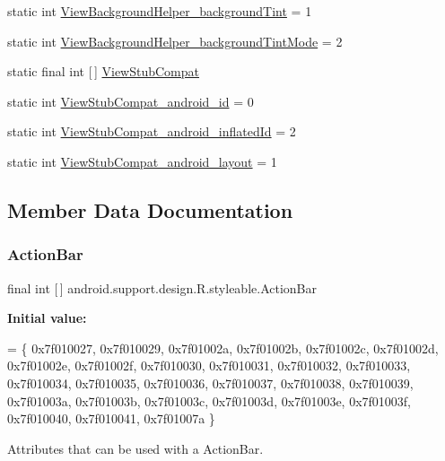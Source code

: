 \begin{DoxyCompactItemize}
\item 
static int \hyperlink{classandroid_1_1support_1_1design_1_1R_1_1styleable_a2e9994ef36fe7a2256990b68a1a32e6b}{View\+Background\+Helper\+\_\+background\+Tint} = 1
\item 
static int \hyperlink{classandroid_1_1support_1_1design_1_1R_1_1styleable_ad51f84023757d5598448db4232fbad8c}{View\+Background\+Helper\+\_\+background\+Tint\+Mode} = 2
\item 
static final int \mbox{[}$\,$\mbox{]} \hyperlink{classandroid_1_1support_1_1design_1_1R_1_1styleable_a9d1ab53e5b97dd9ed9bd6109532344ef}{View\+Stub\+Compat}
\item 
static int \hyperlink{classandroid_1_1support_1_1design_1_1R_1_1styleable_a38b4942d1655f9b64093db09ad074cbe}{View\+Stub\+Compat\+\_\+android\+\_\+id} = 0
\item 
static int \hyperlink{classandroid_1_1support_1_1design_1_1R_1_1styleable_ab000b31614eac45930f7c4b0a8e49919}{View\+Stub\+Compat\+\_\+android\+\_\+inflated\+Id} = 2
\item 
static int \hyperlink{classandroid_1_1support_1_1design_1_1R_1_1styleable_a779184c37f20616420968d01a403c746}{View\+Stub\+Compat\+\_\+android\+\_\+layout} = 1
\end{DoxyCompactItemize}


\subsection{Member Data Documentation}
\mbox{\label{classandroid_1_1support_1_1design_1_1R_1_1styleable_ab795220a96557d11f8c21359b95bed82}} 
\subsubsection{\texorpdfstring{Action\+Bar}{ActionBar}}
{\footnotesize\ttfamily final int \mbox{[}$\,$\mbox{]} android.\+support.\+design.\+R.\+styleable.\+Action\+Bar\hspace{0.3cm}{\ttfamily [static]}}

{\bfseries Initial value\+:}
\begin{DoxyCode}
= \{
            0x7f010027, 0x7f010029, 0x7f01002a, 0x7f01002b,
            0x7f01002c, 0x7f01002d, 0x7f01002e, 0x7f01002f,
            0x7f010030, 0x7f010031, 0x7f010032, 0x7f010033,
            0x7f010034, 0x7f010035, 0x7f010036, 0x7f010037,
            0x7f010038, 0x7f010039, 0x7f01003a, 0x7f01003b,
            0x7f01003c, 0x7f01003d, 0x7f01003e, 0x7f01003f,
            0x7f010040, 0x7f010041, 0x7f01007a
        \}
\end{DoxyCode}
Attributes that can be used with a Action\+Bar. 

